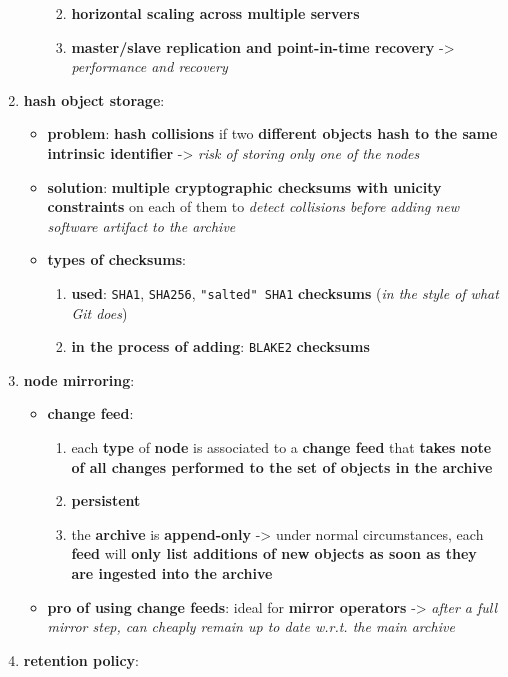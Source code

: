 \documentclass[11pt]{article}
\providecommand{\tightlist}{%
      \setlength{\itemsep}{0pt}\setlength{\parskip}{0pt}}
\begin{document}
\begin{enumerate}
\begin{itemize}
    \begin{enumerate}
    \def\labelenumii{\arabic{enumii}.}
    \tightlist
    \item
      \textbf{horizontal scaling across multiple servers}
    \item
      \textbf{master/slave replication and point-in-time recovery}
      -\textgreater{} \emph{performance and recovery}
    \end{enumerate}
  \end{itemize}
\item
  \textbf{hash object storage}:

  \begin{itemize}
  \tightlist
  \item
    \textbf{problem}: \textbf{hash collisions} if two \textbf{different
    objects hash to the same intrinsic identifier} -\textgreater{}
    \emph{risk of storing only one of the nodes}
  \item
    \textbf{solution}: \textbf{multiple cryptographic checksums with
    unicity constraints} on each of them to \emph{detect collisions
    before adding new software artifact to the archive}
  \item
    \textbf{types of checksums}:

    \begin{enumerate}
    \def\labelenumii{\arabic{enumii}.}
    \tightlist
    \item
      \textbf{used}: \texttt{SHA1}, \texttt{SHA256},
      \texttt{"salted"\ SHA1} \textbf{checksums} (\emph{in the style of
      what Git does})
    \item
      \textbf{in the process of adding}: \texttt{BLAKE2}
      \textbf{checksums}
    \end{enumerate}
  \end{itemize}
\item
  \textbf{node mirroring}:

  \begin{itemize}
  \tightlist
  \item
    \textbf{change feed}:

    \begin{enumerate}
    \def\labelenumii{\arabic{enumii}.}
    \tightlist
    \item
      each \textbf{type} of \textbf{node} is associated to a
      \textbf{change feed} that \textbf{takes note of all changes
      performed to the set of objects in the archive}
    \item
      \textbf{persistent}
    \item
      the \textbf{archive} is \textbf{append-only} -\textgreater{} under
      normal circumstances, each \textbf{feed} will \textbf{only list
      additions of new objects as soon as they are ingested into the
      archive}
    \end{enumerate}
  \item
    \textbf{pro of using change feeds}: ideal for \textbf{mirror
    operators} -\textgreater{} \emph{after a full mirror step, can
    cheaply remain up to date w.r.t. the main archive}
  \end{itemize}
\item
  \textbf{retention policy}:


\end{enumerate}
\end{document}
